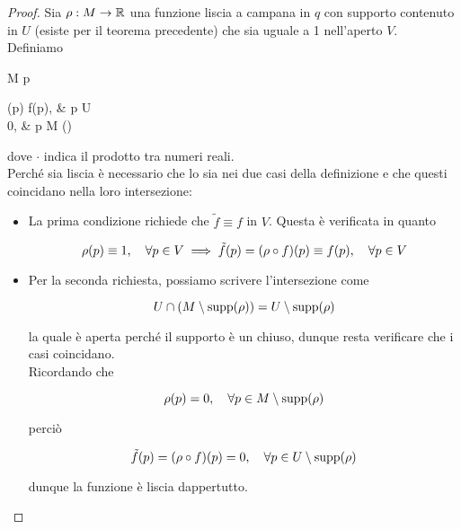 \begin{proof}
	Sia $ \rho : M \to \mathbb{R} $ una funzione liscia a campana in $ q $ con supporto contenuto in $ U $ (esiste per il teorema precedente) che sia uguale a 1 nell'aperto $ V $.\\
	Definiamo
	
		{M}{\R}
		{p}{%
			\begin{cases}
				\rho(p) \cdot f(p), & p \in U \\
				0, & p \in M \setminus \supp(\rho)
			\end{cases}
			}
	
	dove $ \cdot $ indica il prodotto tra numeri reali.\\
	Perché sia liscia è necessario che lo sia nei due casi della definizione e che questi coincidano nella loro intersezione:
	
	\begin{itemize}
		\item La prima condizione richiede che $ \tilde{f} \equiv f $ in $ V $. Questa è verificata in quanto
		
		\begin{equation}
			\rho(p) \equiv 1 \qcomma \forall p \in V \implies \tilde{f}(p) = (\rho \circ f)(p) \equiv f(p) \qcomma \forall p \in V
		\end{equation}
		
		\item Per la seconda richiesta, possiamo scrivere l'intersezione come
		
		\begin{equation}
			U \cap (M \setminus \operatorname{supp}(\rho)) = U \setminus \operatorname{supp}(\rho)
		\end{equation}
		
		la quale è aperta perché il supporto è un chiuso, dunque resta verificare che i casi coincidano.\\
		Ricordando che
		
		\begin{equation}
			\rho(p) = 0 \qcomma \forall p \in M \setminus \supp(\rho)
		\end{equation}
		
		perciò
		
		\begin{equation}
			\tilde{f}(p) = (\rho \circ f)(p) = 0 \qcomma \forall p \in U \setminus \supp(\rho)
		\end{equation}
		
		dunque la funzione è liscia dappertutto.
	\end{itemize}
\end{proof}

